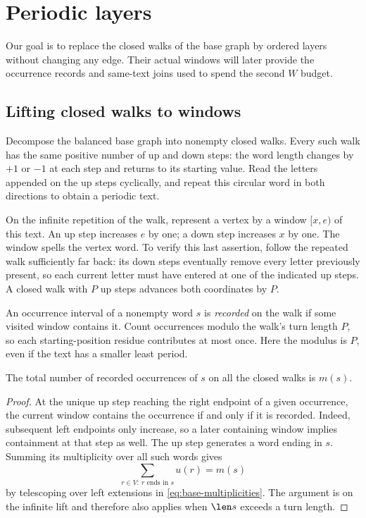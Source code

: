 \section{Periodic layers}\label{sec:layers}

Our goal is to replace the closed walks of the base graph by ordered layers without changing any edge. Their actual windows will later provide the occurrence records and same-text joins used to spend the second $W$ budget.

\subsection{Lifting closed walks to windows}

Decompose the balanced base graph into nonempty closed walks. Every such walk has the same positive number of up and down steps: the word length changes by $+1$ or $-1$ at each step and returns to its starting value. Read the letters appended on the up steps cyclically, and repeat this circular word in both directions to obtain a periodic text.

On the infinite repetition of the walk, represent a vertex by a window $[x,e)$ of this text. An up step increases $e$ by one; a down step increases $x$ by one. The window spells the vertex word. To verify this last assertion, follow the repeated walk sufficiently far back: its down steps eventually remove every letter previously present, so each current letter must have entered at one of the indicated up steps. A closed walk with $P$ up steps advances both coordinates by $P$.

An occurrence interval of a nonempty word $s$ is \emph{recorded} on the walk if some visited window contains it. Count occurrences modulo the walk's turn length $P$, so each starting-position residue contributes at most once. Here the modulus is $P$, even if the text has a smaller least period.

\begin{lemma}\label{lem:recorded}
The total number of recorded occurrences of $s$ on all the closed walks is $m(s)$.
\end{lemma}

\begin{proof}
At the unique up step reaching the right endpoint of a given occurrence, the current window contains the occurrence if and only if it is recorded. Indeed, subsequent left endpoints only increase, so a later containing window implies containment at that step as well. The up step generates a word ending in $s$. Summing its multiplicity over all such words gives
\[
\sum_{r\in V:\ r\text{ ends in }s}u(r)=m(s)
\]
by telescoping over left extensions in \eqref{eq:base-multiplicities}. The argument is on the infinite lift and therefore also applies when $\len s$ exceeds a turn length.
\end{proof}

